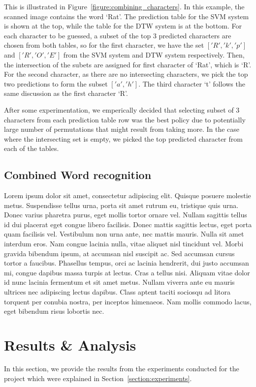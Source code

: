 \documentclass[12pt]{article}
\begin{document}
	
	This is illustrated in Figure~\ref{figure:combining_characters}. In this example, the scanned image contains the word `Rat'. The prediction table for the SVM system is shown at the top, while the table for the DTW system is at the bottom. For each character to be guessed, a subset of the top 3 predicted characters are chosen from both tables, so for the first character, we have the set $['R', 'k', 'p']$ and $['R', 'O', 'E']$ from the SVM system and DTW system respectively. Then, the intersection of the subets are assigned for first character of `Rat', which is `R'. For the second character, as there are no intersecting characters, we pick the top two predictions to form the subset $['a', 'h']$. The third character `t' follows the same discussion as the first character `R'.
	
	After some experimentation, we emperically decided that selecting subset of 3 characters from each prediction table row was the best policy due to potentially large number of permutations that might result from taking more. In the case where the intersecting set is empty, we picked the top predicted character from each of the tables.
	
\subsection{Combined Word recognition}
	\label{subsection:experiments:combinedword}
	Lorem ipsum dolor sit amet, consectetur adipiscing elit. Quisque posuere molestie metus. Suspendisse tellus urna, porta sit amet rutrum eu, tristique quis urna. Donec varius pharetra purus, eget mollis tortor ornare vel. Nullam sagittis tellus id dui placerat eget congue libero facilisis. Donec mattis sagittis lectus, eget porta quam facilisis vel. Vestibulum non urna ante, nec mattis mauris. Nulla sit amet interdum eros. Nam congue lacinia nulla, vitae aliquet nisl tincidunt vel. Morbi gravida bibendum ipsum, at accumsan nisl suscipit ac. Sed accumsan cursus tortor a faucibus. Phasellus tempus, orci ac lacinia hendrerit, dui justo accumsan mi, congue dapibus massa turpis at lectus. Cras a tellus nisi. Aliquam vitae dolor id nunc lacinia fermentum et sit amet metus. Nullam viverra ante eu mauris ultrices nec adipiscing lectus dapibus. Class aptent taciti sociosqu ad litora torquent per conubia nostra, per inceptos himenaeos. Nam mollis commodo lacus, eget bibendum risus lobortis nec.

\section{Results \& Analysis}
\label{section:results}
	In this section, we provide the results from the experiments conducted for the project which were explained in Section~\ref{section:experiments}. 
	
\end{document}
